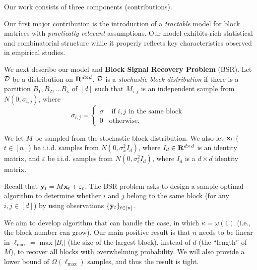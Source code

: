 Our work consists of three components (contributions). 

 Our first major contribution is the introduction of a \emph{tractable} model for block matrices with \emph{practically relevant} assumptions. Our model exhibits rich statistical and combinatorial structure while it properly reflects key characteristics observed in empirical studies. %

We next describe our model and \textbf{Block Signal Recovery Problem} (BSR). Let $\mathcal{D}$ be a distribution on 
$\mathbf{R}^{d \times d}$. $\mathcal{D}$ is a \emph{stochastic block distribution} if there is a partition $B_1, B_2, \dots B_{\kappa}$ of $[d]$ such that $M_{i,j}$ is an independent sample from $N(0, \sigma_{i,j})$, where 
\begin{equation}
\sigma_{i,j} = \left\{
\begin{array}{ll}
\sigma & \mbox{ if $i, j$ in the same block }\\
0 & \mbox{otherwise.}
\end{array}
\right. 
\end{equation}

We let $M$ be sampled from the stochastic block distribution. We also let $\mathbf{x}_t$ ($t \in [n]$) be i.i.d. samples from $N(0, \sigma^2_x I_d)$, where $I_d \in \mathbf{R}^{d \times d}$ is an identity matrix, and $\varepsilon$ be i.i.d. samples from $N(0, \sigma^2_{\epsilon} I_d)$, where $I_d$ is a $d \times d$ identity matrix.  %

Recall that $\mathbf{y}_t = M \mathbf{x}_t + \varepsilon_t$. The BSR problem asks to design a sample-optimal algorithm to determine whether $i$ and $j$ belong to the same block (for any $i, j \in [d]$) by  using observations $\{\mathbf{y}_t\}_{t \in [n]}$. 

 We aim to develop algorithm that can handle the case, in which $\kappa = \omega(1)$ (i.e., the block number can grow). Our main positive result is that $n$ needs to be linear in  $\ell_{\max} = \max|B_i|$ (the size of the largest block), instead of $d$ (the ``length'' of $M$), to recover all blocks with overwhelming probability. We will also provide a lower bound of $\Omega(\ell_{\max})$ samples, and thus the result is tight.

